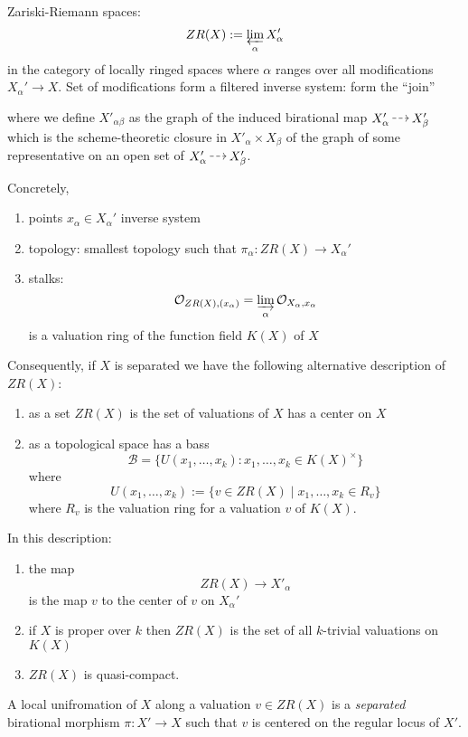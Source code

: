 \documentclass[12pt]{article}
\begin{document}
Zariski-Riemann spaces: 
\[ ZR(X) := \operatorname*{\varprojlim}_{\alpha} X'_\alpha \]
in the category of locally ringed spaces where $\alpha$ ranges over all modifications $X_\alpha' \to X$. Set of modifications form a filtered inverse system: form the ``join''
\begin{center}
\end{center}
where we define $X'_{\alpha\beta}$ as the graph of the induced birational map $X'_\alpha \rat X'_\beta$ which is the scheme-theoretic closure in $X'_\alpha \times X_\beta$ of the graph of some representative on an open set of $X'_\alpha \rat X_\beta'$. 

Concretely,
\begin{enumerate}
\item points $x_\alpha \in X_\alpha'$ inverse system
\item topology: smallest topology such that $\pi_\alpha : ZR(X) \to X_\alpha'$
\item stalks:
\[ \mathcal{O}_{ZR(X), (x_\alpha)} = \operatorname*{\varinjlim}_{\alpha} \mathcal{O}_{X_\alpha, x_\alpha} \]
is a valuation ring of the function field $K(X)$ of $X$ 
\end{enumerate}
Consequently, if $X$ is separated we have the following alternative description of $ZR(X)$:
\begin{enumerate}
\item as a set $ZR(X)$ is the set of valuations of $X$ has a center on $X$
\item as a topological space has a bass
\[ \mathcal{B} = \{ U(x_1, \dots, x_k) : x_1, \dots, x_k \in K(X)^\times \} \]
where
\[ U(x_1, \dots, x_k) := \{ v \in ZR(X) \mid x_1, \dots, x_k \in R_v \} \]
where $R_v$ is the valuation ring for a valuation $v$ of $K(X)$.
\end{enumerate}
In this description:
\begin{enumerate}
\item the map
\[ ZR(X) \to X'_\alpha \]
is the map $v$ to the center of $v$ on $X_\alpha'$
\item if $X$ is proper over $k$ then $ZR(X)$ is the set of all $k$-trivial valuations on $K(X)$
\item $ZR(X)$ is quasi-compact. 
\end{enumerate}

\begin{defn}
A local unifromation of $X$ along a valuation $v \in ZR(X)$ is a \textit{separated} birational morphism $\pi : X' \to X$ such that $v$ is centered on the regular locus of $X'$. 
\end{defn}
\end{document}
